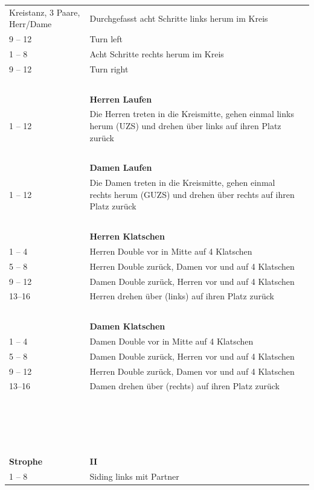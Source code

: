 \documentclass[
	12pt,
	]{scrartcl}
\newcounter{dancecounter}
\newcommand{\danceinfo}[1]{%
	{\raggedleft\footnotesize{#1}\par}
}
\newcommand{\dancename}[1]{
	\stepcounter{dancecounter}
	\pdfbookmark[1]{\texorpdfstring{#1}{\unexpanded{#1}}}{dance-\thedancecounter}
	\begin{tikzpicture}[remember picture, overlay]
		\node[anchor=north, yshift=-0.5cm, inner sep=0, text width=10.5cm, align=center] at (current page.north){\Huge{#1}};
	\end{tikzpicture}
	
}
\newcommand{\danceinstructionsbegin}{\begin{longtable}{p{1cm}p{9.8cm}}}
\newcommand{\danceinstructionsel}{~ & ~ \\}
\begin{document}
\begin{longtable}{p{1cm} p{4.9cm} | p{4.9cm}}
\newpage

\dancename{Gathering Peascods}
%
\danceinfo{Kreistanz, 3 Paare, Herr/Dame}
\danceinstructionsbegin
1 -- 8 	& Durchgefasst acht Schritte links herum im Kreis\\
9 -- 12 & Turn left\\
1 -- 8 	& Acht Schritte rechts herum im Kreis\\
9 -- 12 & Turn right\\
\danceinstructionsel
& \textbf{Herren Laufen}\\
1 -- 12 & Die Herren treten in die Kreismitte, gehen einmal links herum (UZS) und drehen über links auf ihren Platz zurück\\
\danceinstructionsel
& \textbf{Damen Laufen}\\
1 -- 12 & Die Damen treten in die Kreismitte, gehen einmal rechts herum (GUZS) und drehen über rechts auf ihren Platz zurück\\
\danceinstructionsel
& \textbf{Herren Klatschen}\\
1 -- 4 	& Herren Double vor in Mitte auf 4 Klatschen\\
5 -- 8 	& Herren Double zurück, Damen vor und auf 4 Klatschen\\
9 -- 12 & Damen Double zurück, Herren vor und auf 4 Klatschen\\
13--16 	& Herren drehen über (links) auf ihren Platz zurück\\
\danceinstructionsel
& \textbf{Damen Klatschen}\\
1 -- 4 	& Damen Double vor in Mitte auf 4 Klatschen\\
5 -- 8 	& Damen Double zurück, Herren vor und auf 4 Klatschen\\
9 -- 12 & Herren Double zurück, Damen vor und auf 4 Klatschen\\
13--16 	& Damen drehen über (rechts) auf ihren Platz zurück\\
\danceinstructionsel
\danceinstructionsel
\danceinstructionsel
\danceinstructionsel
\textbf{Strophe} & \textbf{II}\\
1 -- 8 	& Siding links mit Partner\\

\end{longtable}
\end{document}
